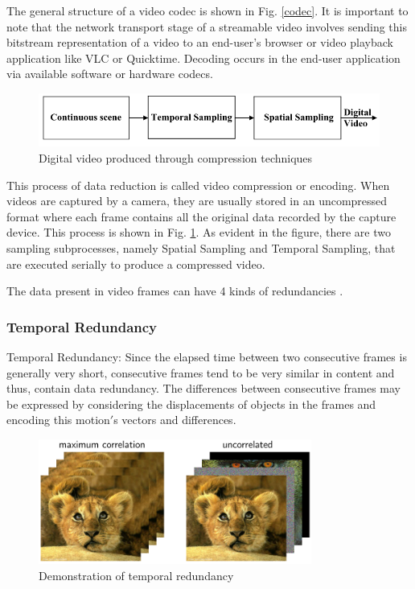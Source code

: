 \documentclass[letterpaper,12pt,titlepage,oneside,final]{report}
\begin{document}
            The general structure of a video codec is shown in Fig. \ref{codec}. It is important to note that the network transport stage of a streamable video involves sending this bitstream representation of a video to an end-user's browser or video playback application like VLC or Quicktime. Decoding occurs in the end-user application via available software or hardware codecs.
            \begin{figure}[!h]
                \centering
                \includegraphics[width=\textwidth]{videnc}
                \caption{Digital video produced through compression techniques}
                \label{videnc}
            \end{figure}

            This process of data reduction is called video compression or encoding. When videos are captured by a camera, they are usually stored in an uncompressed format where each frame contains all the original data recorded by the capture device. This process is shown in Fig. \ref{videnc}. As evident in the figure, there are two sampling subprocesses, namely Spatial Sampling and Temporal Sampling, that are executed serially to produce a compressed video. 

            The data present in video frames can have 4 kinds of redundancies \cite{Saggi2010}.
            \subsubsection{Temporal Redundancy} %
            \label{sub:temporal_redundancy}
                Temporal Redundancy: Since the elapsed time between two consecutive frames is generally very short, consecutive frames tend to be very similar in content and thus, contain data redundancy. The differences between consecutive frames may be expressed by considering the displacements of objects in the frames and encoding this motion$'$s vectors and differences. 
                \begin{figure}[!h]
                    \centering
                    \includegraphics[width=0.8\textwidth]{tempredun}
                    \caption{Demonstration of temporal redundancy\cite{Kundur}}
                    \label{tempredun}
                \end{figure}
\end{document}
